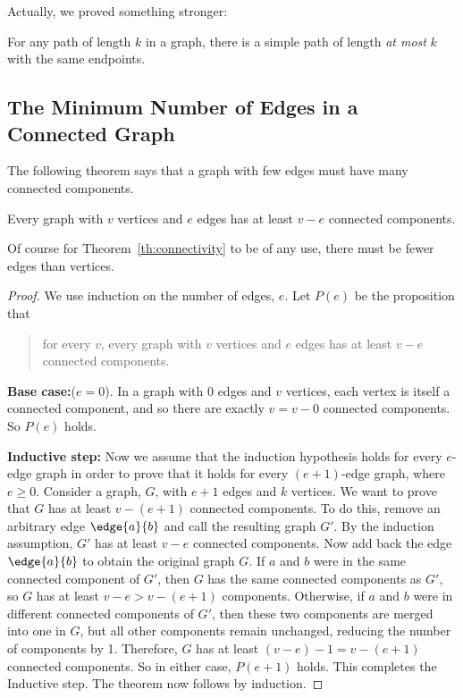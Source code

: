 Actually, we proved something stronger:
\begin{corollary}\label{ss}
For any path of length $k$ in a graph, there is a simple path of length
\emph{at most} $k$ with the same endpoints.
\end{corollary}

\subsection{The Minimum Number of Edges in a Connected Graph}
The following theorem says that a graph with few edges must have many
connected components.
\begin{theorem} \label{th:connectivity}
Every graph with $v$ vertices and $e$ edges has at least $v - e$ connected
components.
\end{theorem}
Of course for Theorem~\ref{th:connectivity} to be of any use, there must
be fewer edges than vertices.

\begin{proof}
We use induction on the number of edges, $e$.  Let $P(e)$ be the
proposition that
\begin{quote}
for every $v$, every graph with $v$ vertices and $e$ edges has at least
$v-e$ connected components.
\end{quote}

\textbf{Base case:}($e=0$).  In a graph with 0 edges and $v$ vertices,
each vertex is itself a connected component, and so there are exactly $v =
v - 0$ connected components.  So $P(e)$ holds.

\textbf{Inductive step:} Now we assume that the induction hypothesis holds
for every $e$-edge graph in order to prove that it holds for every
$(e+1)$-edge graph, where $e \geq 0$.
Consider a graph, $G$, with $e + 1$ edges and $k$ vertices.  We want to
prove that $G$ has at least $v - (e+1)$ connected components.
To do this, remove an arbitrary edge $\edge{a}{b}$ and call the resulting
graph $G'$.  By the induction assumption, $G'$ has at least $v - e$
connected components.
Now add back the edge $\edge{a}{b}$ to obtain the original graph $G$.  If
$a$ and $b$ were in the same connected component of $G'$, then $G$ has the
same connected components as $G'$, so $G$ has at least $v -e > v - (e+1)$
components.  Otherwise, if $a$ and $b$ were in different connected
components of $G'$, then these two components are merged into one in $G$,
but all other components remain unchanged, reducing the number of
components by 1.  Therefore, $G$ has at least $(v - e) - 1 = v - (e+1)$
connected components.  So in either case, $P(e+1)$ holds.  This completes
the Inductive step.
The theorem now follows by induction.
\end{proof}

